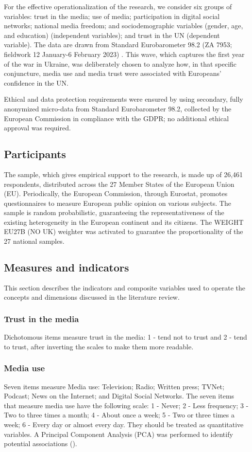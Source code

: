 \documentclass[english]{textolivre}
\begin{document}
For the effective operationalization of the research, we consider six groups of variables: trust in the media; use of media; participation in digital social networks; national media freedom; and sociodemographic variables (gender, age, and education) (independent variables); and trust in the UN (dependent variable). The data are drawn from Standard Eurobarometer 98.2 (ZA 7953; fieldwork 12 January-6 February 2023) \cite{europeancommission2023}. This wave, which captures the first year of the war in Ukraine, was deliberately chosen to analyze how, in that specific conjuncture, media use and media trust were associated with Europeans’ confidence in the UN.

Ethical and data protection requirements were ensured by using secondary, fully anonymized micro-data from Standard Eurobarometer 98.2, collected by the European Commission in compliance with the GDPR; no additional ethical approval was required.

\subsection{Participants}
The sample, which gives empirical support to the research, is made up of 26,461 respondents, distributed across the 27 Member States of the European Union (EU). Periodically, the European Commission, through Eurostat, promotes questionnaires to measure European public opinion on various subjects. The sample is random probabilistic, guaranteeing the representativeness of the existing heterogeneity in the European continent and its citizens. The WEIGHT EU27B (NO UK) weighter was activated to guarantee the proportionality of the 27 national samples.

\subsection{Measures and indicators}
This section describes the indicators and composite variables used to operate the concepts and dimensions discussed in the literature review.

\subsubsection{Trust in the media}
Dichotomous items measure trust in the media: 1 - tend not to trust and 2 - tend to trust, after inverting the scales to make them more readable.

\subsubsection{Media use}
Seven items measure Media use: Television; Radio; Written press; TVNet; Podcast; News on the Internet; and Digital Social Networks. The seven items that measure media use have the following scale: 1 - Never; 2 - Less frequency; 3 - Two to three times a month; 4 - About once a week; 5 - Two or three times a week; 6 - Every day or almost every day. They should be treated as quantitative variables. A Principal Component Analysis (PCA) was performed to identify potential associations ().
\end{document}
